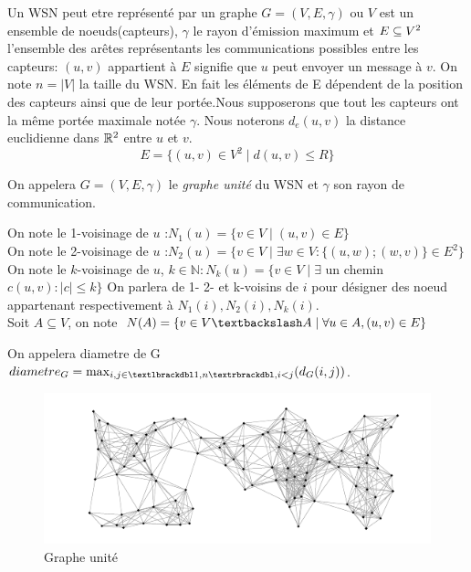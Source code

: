   Un WSN peut etre représenté par un graphe $G= (V,E,\gamma)$ ou $V$ est un ensemble de noeuds(capteurs), $\gamma$ le rayon d'émission maximum et $E \subseteq V \textsuperscript{2}$ l'ensemble des arêtes représentants les communications
 possibles entre les capteurs: $(u,v)$ appartient à $E$ signifie que $u$ peut envoyer un  message à $v$. On note $ n=|V| $ la taille du WSN. En fait les éléments de E dépendent de la position des capteurs ainsi que de leur portée.Nous 
supposerons que tout les capteurs ont la même portée maximale notée $\gamma$. Nous noterons $d_e(u,v)$ la distance euclidienne dans $\mathbb{R} \textsuperscript{2}$ entre $u$ et $v$.
$$E = \{ (u,v) \in V ^{2} \mid d(u,v) \leq R \}$$

\begin{mydef}
 On appelera $G= (V,E,\gamma)$ le \textit{graphe unité} du WSN et $\gamma$ son rayon de communication.
\end{mydef}

\begin{mydef}
On note le 1-voisinage de $u$ :$N_1(u) = \{ v \in V  \mid (u,v) \in E \}$ \\
On note le 2-voisinage de $u$ :$N_2(u) = \{ v \in V \mid  \exists w \in V :\{(u,w);(w,v)\} \in E ^2\}$ \\
On note le $k$-voisinage de $u$, $k \in \mathbb{N} : N_k(u) = \{ v \in V  \mid \exists $ un chemin $c (u,v): |c| \leq k\}$  On parlera de 1- 2- et k-voisins de $i$ pour désigner des noeud appartenant respectivement à $N_1(i),
N_2(i),N_k(i)$. \\
Soit $A \subseteq V$, on note $N(A) = \{ v \in V\textbackslash  A \mid \forall u\in A,(u,v) \in E \}$ \\
\end{mydef}

\begin{mydef}
 On appelera diametre de G $diametre_G=\max_{i,j\in \textlbrackdbl 1,n \textrbrackdbl,i<j}(d_G(i,j))$.
\end{mydef}
 
\begin{figure}[H]
\centering
\includegraphics[scale=0.5]{source/graph1.png}
\caption{Graphe unité}
\end{figure} 


